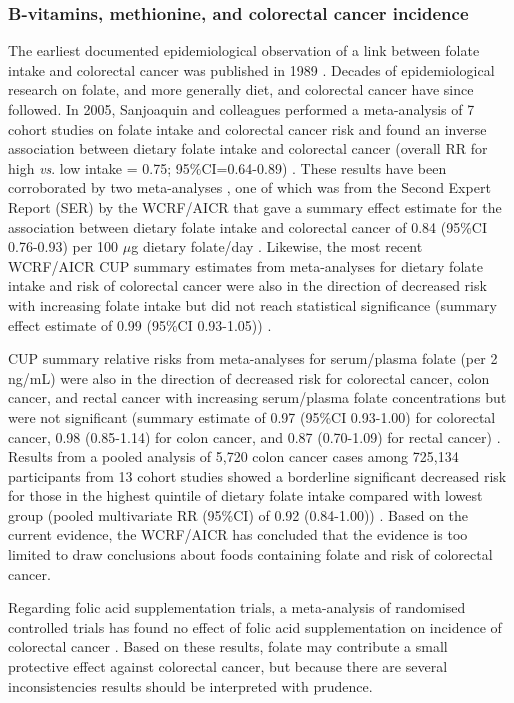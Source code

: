 \subsubsection{B-vitamins, methionine, and colorectal cancer incidence} %
\noindent The earliest documented epidemiological observation of a link between folate intake and colorectal cancer was published in 1989 \cite{c159}. Decades of epidemiological research on folate, and more generally diet, and colorectal cancer have since followed. In 2005, Sanjoaquin and colleagues performed a meta-analysis of 7 cohort studies on folate intake and colorectal cancer risk and found an inverse association between dietary folate intake and colorectal cancer (overall RR for high \textit{vs}. low intake = 0.75; 95\%CI=0.64-0.89) \cite{c160}. These results have been corroborated by two meta-analyses \cite{c126,c161}, one of which was from the Second Expert Report (SER) by the WCRF/AICR that gave a summary effect estimate for the association between dietary folate intake and colorectal cancer of 0.84 (95\%CI 0.76-0.93) per 100 $\mu$g dietary folate/day \cite{c126}. Likewise, the most recent WCRF/AICR CUP summary estimates from meta-analyses for dietary folate intake and risk of colorectal cancer 
were also in the direction of decreased risk with increasing folate intake but did not reach statistical significance (summary effect estimate of 0.99 (95\%CI 0.93-1.05)) \cite{c127}. 
 
\noindent CUP summary relative risks from meta-analyses for serum/plasma folate (per 2 ng/mL) were also in the direction of decreased risk for colorectal cancer, colon cancer, and rectal cancer with increasing serum/plasma folate concentrations but were not significant (summary estimate of 0.97 (95\%CI 0.93-1.00) for colorectal cancer, 0.98 (0.85-1.14) for colon cancer, and 0.87 (0.70-1.09) for rectal cancer) \cite{c127}. Results from a pooled analysis of 5,720 colon cancer cases among 725,134 participants from 13 cohort studies showed a borderline significant decreased risk for those in the highest quintile of dietary folate intake compared with lowest group (pooled multivariate RR (95\%CI) of 0.92 (0.84-1.00)) \cite{c162}. Based on the current evidence, the WCRF/AICR has concluded that the evidence is too limited to draw conclusions about foods containing folate and risk of colorectal cancer. 
 
\noindent Regarding folic acid supplementation trials, a meta-analysis of randomised controlled trials has found no effect of folic acid supplementation on incidence of colorectal cancer \cite{c163}. Based on these results, folate may contribute a small protective effect against colorectal cancer, but because there are several inconsistencies results should be interpreted with prudence. 
 
